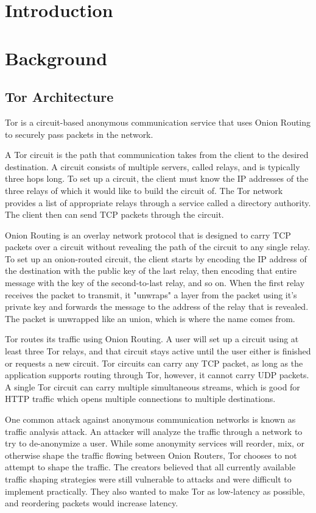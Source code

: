 \documentclass[12pt,journal]{IEEEtran}
\providecommand{\keywords}[1]{\textbf{Keywords} #1}
\begin{document}

\section{Introduction}
\section{Background}
\subsection{Tor Architecture}
Tor is a circuit-based anonymous communication service that uses Onion Routing to securely pass packets in the network.
\par
A Tor circuit is the path that communication takes from the client to the desired destination. A circuit consists of multiple servers, called relays, and is typically three hops long. To set up a circuit, the client must know the IP addresses of the three relays of which it would like to build the circuit of. The Tor network provides a list of appropriate relays through a service called a directory authority. The client then can send TCP packets through the circuit.
\par
Onion Routing is an overlay network protocol that is designed to carry TCP packets over a circuit without revealing the path of the circuit to any single relay. To set up an onion-routed circuit, the client starts by encoding the IP address of the destination with the public key of the last relay, then encoding that entire message with the key of the second-to-last relay, and so on. When the first relay receives the packet to transmit, it "unwraps" a layer from the packet using it's private key and forwards the message to the address of the relay that is revealed. The packet is unwrapped like an union, which is where the name comes from.
\par
Tor routes its traffic using Onion Routing. A user will set up a circuit using at least three Tor relays, and that circuit stays active until the user either is finished or requests a new circuit. Tor circuits can carry any TCP packet, as long as the application supports routing through Tor, however, it cannot carry UDP packets. A single Tor circuit can carry multiple simultaneous streams, which is good for HTTP traffic which opens multiple connections to multiple destinations.
\par
One common attack against anonymous communication networks is known as traffic analysis attack. An attacker will analyze the traffic through a network to try to de-anonymize a user. While some anonymity services will reorder, mix, or otherwise shape the traffic flowing between Onion Routers, Tor chooses to not attempt to shape the traffic. The creators believed that all currently available traffic shaping strategies were still vulnerable to attacks and were difficult to implement practically. They also wanted to make Tor as low-latency as possible, and reordering packets would increase latency.
\end{document}
